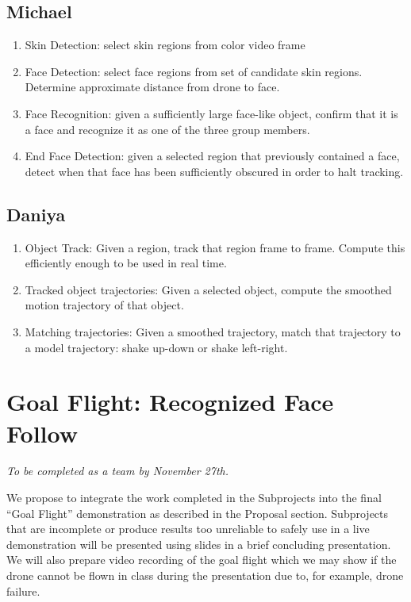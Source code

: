 \documentclass{article}
\begin{document}
\begin{spacing}{1.1}
\subsection{Michael}
\begin{enumerate}
\item Skin Detection: select skin regions from color video frame

\item Face Detection: select face regions from set of candidate skin
regions. Determine approximate distance from drone to face.

\item Face Recognition: given a sufficiently large face-like object,
confirm that it is a face and recognize it as one of the three group
members.

\item End Face Detection: given a selected region that previously
  contained a face, detect when that face has been sufficiently
  obscured in order to halt tracking.
\end{enumerate}

\subsection{Daniya}
\begin{enumerate}
\item Object Track: Given a region, track that region frame to frame.
Compute this efficiently enough to be used in real time.

\item Tracked object trajectories: Given a selected object, compute the
smoothed motion trajectory of that object.

\item Matching trajectories: Given a smoothed trajectory, match that
trajectory to a model trajectory: shake up-down or shake left-right.
\end{enumerate}


\section{Goal Flight: Recognized Face Follow}
\textit{To be completed as a team by November 27th.}

We propose to integrate the work completed in the Subprojects into the
final ``Goal Flight'' demonstration as described in the Proposal
section. Subprojects that are incomplete or produce results too
unreliable to safely use in a live demonstration will be presented
using slides in a brief concluding presentation. We will also prepare
video recording of the goal flight which we may show if the drone
cannot be flown in class during the presentation due to, for example,
drone failure.


\end{spacing}
\end{document}
